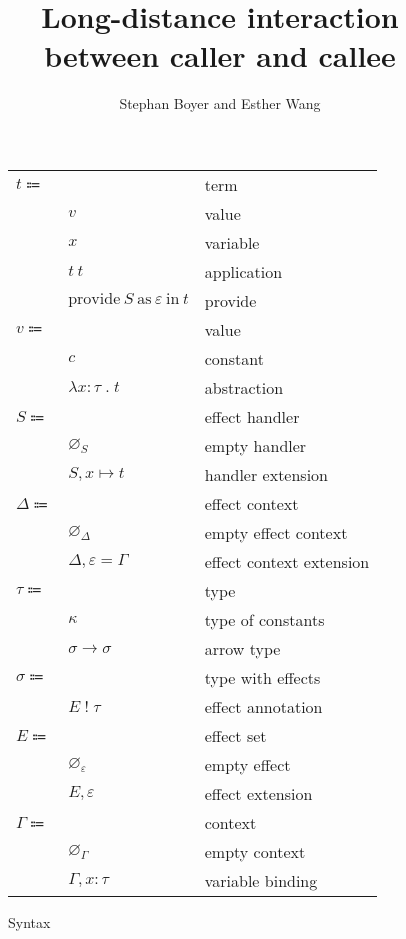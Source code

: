 \documentclass[12pt]{article}
\title{Long-distance interaction \\ between caller and callee}
\author{Stephan Boyer and Esther Wang}
\date{}
\newcommand\eterm{t}
\newcommand\evalue{v}
\newcommand\econst{c}
\newcommand\evar{x}
\newcommand\eabs[2]{\lambda#1\;.\;#2}
\newcommand\eapp[2]{#1\ #2}
\newcommand\eprovide[3]{\text{provide}\ #1\ \text{as}\ #2\ \text{in}\ #3}
\newcommand\pall{S}
\newcommand\pitem[2]{#1\mapsto#2}
\newcommand\pempty{\varnothing_{\pall}}
\newcommand\pextend[2]{#1, #2}
\newcommand\ttype{\tau}
\newcommand\tconst{\kappa}
\newcommand\tarrow[2]{#1\rightarrow#2}
\newcommand\tanno[2]{#1:#2}
\newcommand\tx{\sigma}
\newcommand\twithx[2]{#1\;!\;#2}
\newcommand\xeffect{\varepsilon}
\newcommand\xeffects{E}
\newcommand\xempty{\varnothing_{\xeffect}}
\newcommand\xextend[2]{#1, #2}
\newcommand\xc{\Delta}
\newcommand\xcempty{\varnothing_{\xc}}
\newcommand\xcextend[2]{#1, #2}
\newcommand\xcitem[2]{#1 = #2}
\newcommand\ccontext{\Gamma}
\newcommand\cempty{\varnothing_{\ccontext}}
\newcommand\cextend[2]{#1, #2}
\begin{document}
  \maketitle

  \begin{figure}
    \begin{mdframed}
      \begin{center}
        \begin{tabular}{l l l}
          $\eterm \Coloneqq $ & & term \\
          & $\evalue$ & value \\
          & $\evar$ & variable \\
          & $\eapp{\eterm}{\eterm}$ & application \\
          & $\eprovide{\pall}{\xeffect}{\eterm}$ & provide \\
          $\evalue \Coloneqq $ & & value \\
          & $\econst$ & constant \\
          & $\eabs{\tanno{\evar}{\ttype}}{\eterm}$ & abstraction \\
          $\pall \Coloneqq$ & & effect handler \\
          & $\pempty$ & empty handler \\
          & $\pextend{\pall}{\pitem{\evar}{\eterm}}$ & handler extension \\
          $\xc \Coloneqq$ & & effect context \\
          & $\xcempty$ & empty effect context \\
          & $\xcextend{\xc}{\xcitem{\xeffect}{\ccontext}}$ & effect context extension \\
          $\ttype \Coloneqq$ & & type \\
          & $\tconst$ & type of constants \\
          & $\tarrow{\tx}{\tx}$ & arrow type \\
          $\tx \Coloneqq$ & & type with effects \\
          & $\twithx{\xeffects}{\ttype}$ & effect annotation \\
          $\xeffects \Coloneqq$ & & effect set \\
          & $\xempty$ & empty effect \\
          & $\xextend{\xeffects}{\xeffect}$ & effect extension \\
          $\ccontext \Coloneqq$ & & context \\
          & $\cempty$ & empty context \\
          & $\cextend{\ccontext}{\tanno{\evar}{\ttype}}$ & variable binding \\
        \end{tabular}
      \end{center}

      \caption{Syntax}\label{fig:syntax}
    \end{mdframed}
  \end{figure}
\end{document}
